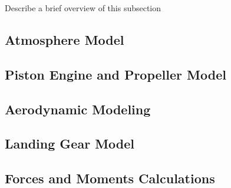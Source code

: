 \documentclass[../chapter_2.tex]{subfiles}
\begin{document}
Describe a brief overview of this subsection
\subsection{Atmosphere Model}

\clearpage
\subsection{Piston Engine and Propeller Model}

\clearpage
\subsection{Aerodynamic Modeling}

\clearpage
\subsection{Landing Gear Model}

\clearpage
\subsection{Forces and Moments Calculations}

\clearpage
\end{document}
